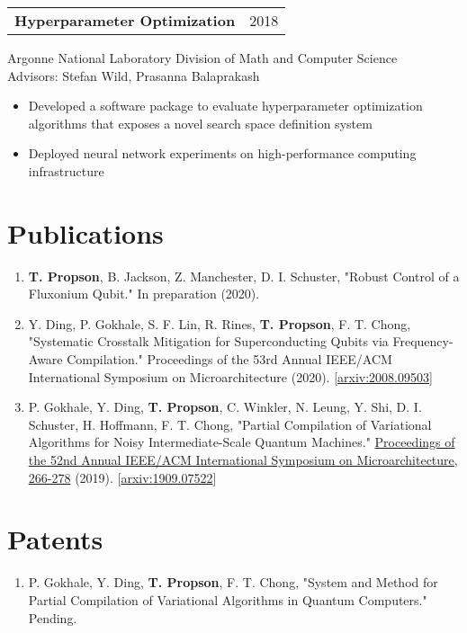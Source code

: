 \documentclass[letterpaper, 12pt]{article}
\begin{document}
\begin{tabular}{@{} L{12cm} @{} R{4.51cm} @{}}
  \textbf{Hyperparameter Optimization} & 2018\\
\end{tabular}
Argonne National Laboratory Division of Math and Computer Science\\
Advisors: Stefan Wild, Prasanna Balaprakash
\begin{itemize}
\item Developed a software package to evaluate hyperparameter optimization algorithms
  that exposes a novel search space definition system
  \item Deployed neural network experiments on high-performance computing infrastructure 
\end{itemize}

\section{Publications}
\begin{enumerate}
\item \textbf{T. Propson}, B. Jackson, Z. Manchester, D. I. Schuster, "Robust Control
  of a Fluxonium Qubit." In preparation (2020).
\item Y. Ding, P. Gokhale, S. F. Lin, R. Rines, \textbf{T. Propson}, F. T. Chong,
  "Systematic Crosstalk Mitigation for Superconducting Qubits via Frequency-Aware Compilation."
  Proceedings of the 53rd Annual
  IEEE/ACM International Symposium on Microarchitecture (2020).
       [\href{https://arxiv.org/abs/2008.09503}{arxiv:2008.09503}]
\item P. Gokhale, Y. Ding, \textbf{T. Propson}, C. Winkler, N. Leung, Y. Shi,
  D. I. Schuster, H. Hoffmann, F. T. Chong,
  "Partial Compilation of Variational Algorithms for Noisy Intermediate-Scale Quantum Machines."
  \href{https://doi.org/10.1145/3352460.3358313}{Proceedings of the 52nd Annual
    IEEE/ACM International Symposium on Microarchitecture, 266-278} (2019).
       [\href{https://arxiv.org/abs/1909.07522}{arxiv:1909.07522}]
\end{enumerate}

\pagebreak

\section{Patents}
\begin{enumerate}
  \item P. Gokhale, Y. Ding, \textbf{T. Propson}, F. T. Chong, "System and Method
    for Partial Compilation of Variational Algorithms in Quantum Computers." Pending.
\end{enumerate}
\end{document}

